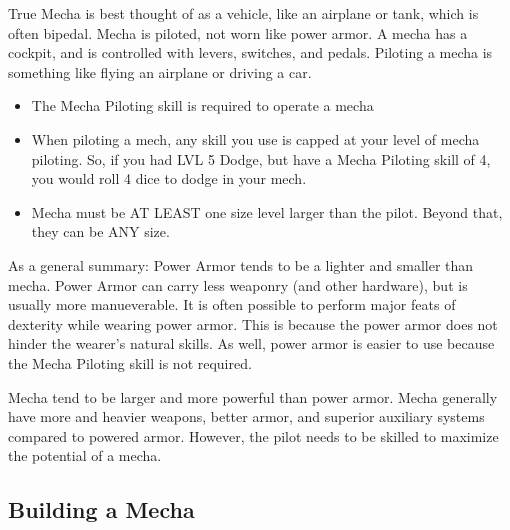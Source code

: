 \documentclass[twoside]{book}
\begin{document}
    {  
     True Mecha is best thought of as a vehicle, like an
             airplane or tank, which is often bipedal. Mecha is piloted,
             not worn like power armor. A mecha has a cockpit, and is
             controlled with levers, switches, and pedals. Piloting a
             mecha is something like flying an airplane or driving a car.
             
    }
  
\begin{itemize}
      
  \item  The Mecha Piloting skill is required to operate a
               mecha 
  \item  When piloting a mech, any skill you use is capped at
               your level of mecha piloting. So, if you had LVL 5 Dodge,
               but have a Mecha Piloting skill of 4, you would roll 4
               dice to dodge in your mech. 
  \item  Mecha must be AT LEAST one size level larger than
               the pilot. Beyond that, they can be ANY size. 
\end{itemize}
  
    {  
     As a general summary: Power Armor tends to be a
             lighter and smaller than mecha. Power Armor can carry less
             weaponry (and other hardware), but is usually more
             manueverable. It is often possible to perform major feats of
             dexterity while wearing power armor. This is because the
             power armor does not hinder the wearer's natural
             skills. As well, power armor is easier to use because the
             Mecha Piloting skill is not required. 
    }
  
    {  
     Mecha tend to be larger and more powerful than power
             armor. Mecha generally have more and heavier weapons, better
             armor, and superior auxiliary systems compared to powered
             armor. However, the pilot needs to be skilled to maximize
             the potential of a mecha. 
    }
  
    

\subsection{Building a Mecha}
    
\end{document}
